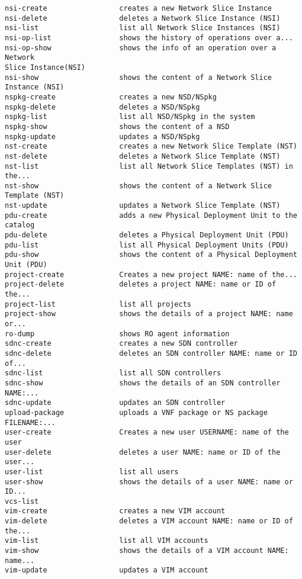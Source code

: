 \begin{lstlisting}
nsi-create                 creates a new Network Slice Instance
nsi-delete                 deletes a Network Slice Instance (NSI)
nsi-list                   list all Network Slice Instances (NSI)
nsi-op-list                shows the history of operations over a...
nsi-op-show                shows the info of an operation over a Network
Slice Instance(NSI)
nsi-show                   shows the content of a Network Slice Instance (NSI)
nspkg-create               creates a new NSD/NSpkg
nspkg-delete               deletes a NSD/NSpkg
nspkg-list                 list all NSD/NSpkg in the system
nspkg-show                 shows the content of a NSD
nspkg-update               updates a NSD/NSpkg
nst-create                 creates a new Network Slice Template (NST)
nst-delete                 deletes a Network Slice Template (NST)
nst-list                   list all Network Slice Templates (NST) in the...
nst-show                   shows the content of a Network Slice Template (NST)
nst-update                 updates a Network Slice Template (NST)
pdu-create                 adds a new Physical Deployment Unit to the
catalog
pdu-delete                 deletes a Physical Deployment Unit (PDU)
pdu-list                   list all Physical Deployment Units (PDU)
pdu-show                   shows the content of a Physical Deployment Unit (PDU)
project-create             Creates a new project NAME: name of the...
project-delete             deletes a project NAME: name or ID of the...
project-list               list all projects
project-show               shows the details of a project NAME: name or...
ro-dump                    shows RO agent information
sdnc-create                creates a new SDN controller
sdnc-delete                deletes an SDN controller NAME: name or ID of...
sdnc-list                  list all SDN controllers
sdnc-show                  shows the details of an SDN controller NAME:...
sdnc-update                updates an SDN controller
upload-package             uploads a VNF package or NS package FILENAME:...
user-create                Creates a new user USERNAME: name of the user
user-delete                deletes a user NAME: name or ID of the user...
user-list                  list all users
user-show                  shows the details of a user NAME: name or ID...
vcs-list
vim-create                 creates a new VIM account
vim-delete                 deletes a VIM account NAME: name or ID of the...
vim-list                   list all VIM accounts
vim-show                   shows the details of a VIM account NAME: name...
vim-update                 updates a VIM account

\end{lstlisting}
